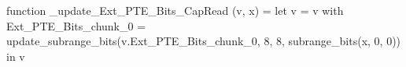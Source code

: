 function _update_Ext_PTE_Bits_CapRead (v, x) = let v = { v with Ext_PTE_Bits_chunk_0 = update_subrange_bits(v.Ext_PTE_Bits_chunk_0, 8, 8, subrange_bits(x, 0, 0)) } in
  v
